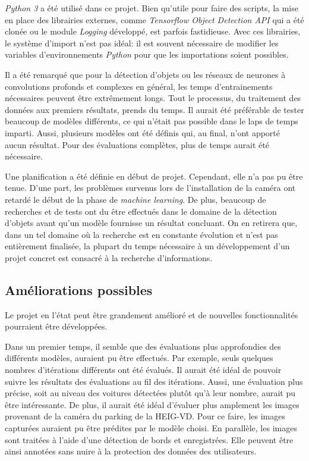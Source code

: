 \textit{Python 3} a été utilisé dans ce projet. Bien qu'utile pour faire des scripts, la mise en place des librairies externes, comme \textit{Tensorflow Object Detection API} qui a été clonée ou le module \textit{Logging} développé, est parfois fastidieuse. Avec ces librairies, le système d'import n'est pas idéal: il est souvent nécessaire de modifier les variables d'environnements \textit{Python} pour que les importations soient possibles.

Il a été remarqué que pour la détection d'objets ou les réseaux de neurones à convolutions profonds et complexes en général, les temps d'entrainements nécessaires peuvent être extrêmement longs. Tout le processus, du traitement des données aux premiers résultats, prends du temps. Il aurait été préférable de tester beaucoup de modèles différents, ce qui n'était pas possible dans le laps de temps imparti. Aussi, plusieurs modèles ont été définis qui, au final, n'ont apporté aucun résultat. Pour des évaluations complètes, plus de temps aurait été nécessaire.

Une planification a été définie en début de projet. Cependant, elle n'a pas pu être tenue. D'une part, les problèmes survenus lors de l'installation de la caméra ont retardé le début de la phase de \textit{machine learning}. De plus, beaucoup de recherches et de tests ont du être effectués dans le domaine de la détection d'objets avant qu'un modèle fournisse un résultat concluant. On en retirera que, dans un tel domaine où la recherche est en constante évolution et n'est pas entièrement finalisée, la plupart du temps nécessaire à un développement d'un projet concret est consacré à la recherche d'informations.

\subsection{Améliorations possibles}
Le projet en l'état peut être grandement amélioré et de nouvelles fonctionnalités pourraient être développées.

Dans un premier temps, il semble que des évaluations plus approfondies des différents modèles, auraient pu être effectués. Par exemple, seuls quelques nombres d'itérations différents ont été évalués. Il aurait été idéal de pouvoir suivre les résultats des évaluations au fil des itérations. Aussi, une évaluation plus précise, soit au niveau des voitures détectées plutôt qu'à leur nombre, aurait pu être intéressante. De plus, il aurait été idéal d'évaluer plus amplement les images provenant de la caméra du parking de la HEIG-VD. Pour ce faire, les images capturées auraient pu être prédites par le modèle choisi. En parallèle, les images sont traitées à l'aide d'une détection de bords et enregistrées. Elle peuvent être ainsi annotées sans nuire à la protection des données des utilisateurs. 


